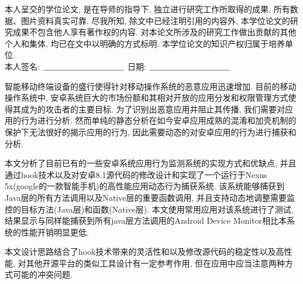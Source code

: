 {%

本人呈交的学位论文, 是在导师的指导下, 独立进行研究工作所取得的成果,
所有数据、图片资料真实可靠. 尽我所知, 除文中已经注明引用的内容外,
本学位论文的研究成果不包含他人享有著作权的内容.
对本论文所涉及的研究工作做出贡献的其他个人和集体,
均已在文中以明确的方式标明. 本学位论文的知识产权归属于培养单位.\\[2cm]

\hspace*{1cm}本人签名: $\underline{\hspace{3.5cm}}$
\hspace{2cm}日期: $\underline{\hspace{3.5cm}}$\hfill\par}
\baselineskip=23pt  %





\begin{cnabstract}
智能移动终端设备的盛行使得针对移动操作系统的恶意应用迅速增加. 目前的移动操作系统中, 安卓系统巨大的市场份额和其相对开放的应用分发和权限管理方式使得其成为的攻击者的主要目标. 为了识别出恶意应用并阻止其传播, 我们需要对应用的行为进行分析. 然而单纯的静态分析在如今安卓应用成熟的混淆和加壳机制的保护下无法很好的揭示应用的行为, 因此需要动态的对安卓应用的行为进行捕获和分析. 

本文分析了目前已有的一些安卓系统应用行为监测系统的实现方式和优缺点, 并且通过hook技术以及对安卓8.1源代码的修改设计和实现了一个运行于Nexus 5x(google的一款智能手机)的高性能应用动态行为捕获系统. 该系统能够捕获到Java层的所有方法调用以及Native层的重要函数调用, 并且支持动态地调整需要监控的目标方法(Java层)和函数(Native层). 本文使用常用应用对该系统进行了测试, 结果显示与同样能捕获到所有java层方法调用的Android Device Monitor相比本系统的性能开销明显更低.

本文设计思路结合了hook技术带来的灵活性和以及修改源代码的稳定性以及高性能, 对其他开源平台的类似工具设计有一定参考作用, 但在应用中应当注意两种方式可能的冲突问题.




\end{cnabstract}
\par
\vspace*{2em}




